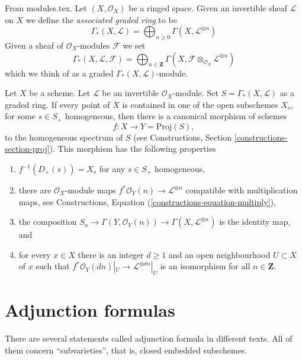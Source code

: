 \begin{definition}
\label{definition-gamma-star}
From modules.tex. Let $(X, \mathcal{O}_X)$ be a ringed space.
Given an invertible sheaf $\mathcal{L}$ on $X$ we define
the {\it associated graded ring} to be
$$
\Gamma_*(X, \mathcal{L})
=
\bigoplus\nolimits_{n \geq 0} \Gamma(X, \mathcal{L}^{\otimes n})
$$
Given a sheaf of $\mathcal{O}_X$-modules $\mathcal{F}$ we set
$$
\Gamma_*(X, \mathcal{L}, \mathcal{F})
=
\bigoplus\nolimits_{n \in \mathbf{Z}} \Gamma(X,
\mathcal{F} \otimes_{\mathcal{O}_X} \mathcal{L}^{\otimes n})
$$
which we think of as a graded $\Gamma_*(X, \mathcal{L})$-module.
\end{definition}

\begin{lemma}
\label{lemma-map-into-proj}
Let $X$ be a scheme.
Let $\mathcal{L}$ be an invertible $\mathcal{O}_X$-module.
Set $S = \Gamma_*(X, \mathcal{L})$ as a graded ring.
If every point of $X$ is contained in one of the
open subschemes $X_s$, for some $s \in S_{+}$ homogeneous, then
there is a canonical morphism of schemes
$$
f : X \longrightarrow Y = \text{Proj}(S),
$$
to the homogeneous spectrum of $S$ (see
Constructions, Section \ref{constructions-section-proj}).
This morphism has the following properties
\begin{enumerate}
\item $f^{-1}(D_{+}(s)) = X_s$ for any $s \in S_{+}$ homogeneous,
\item there are $\mathcal{O}_X$-module maps
$f^*\mathcal{O}_Y(n) \to \mathcal{L}^{\otimes n}$
compatible with multiplication maps, see
Constructions, Equation (\ref{constructions-equation-multiply}),
\item the composition
$S_n \to \Gamma(Y, \mathcal{O}_Y(n)) \to \Gamma(X, \mathcal{L}^{\otimes n})$
is the identity map, and
\item for every $x \in X$ there is an integer $d \geq 1$
and an open neighbourhood $U \subset X$ of $x$
such that $f^*\mathcal{O}_Y(dn)|_U \to \mathcal{L}^{\otimes dn}|_U$
is an isomorphism for all $n \in \mathbf{Z}$.
\end{enumerate}
\end{lemma}

\section{Adjunction formulas}
\label{section-adjunction formulas}

There are several statements called adjunction formula
in different texts. All of them concern ``subvarieties'',
that is, closed embedded subschemes.

